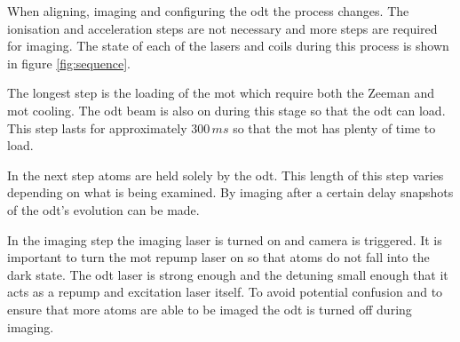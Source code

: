 When aligning, imaging and configuring the \gls{odt} the process changes. The ionisation and acceleration steps are not necessary and more steps are required for imaging. The state of each of the lasers and coils during this process is shown in figure \ref{fig:sequence}.

The longest step is the loading of the \gls{mot} which require both the Zeeman and \gls{mot} cooling. The \gls{odt} beam is also on during this stage so that the \gls{odt} can load. This step lasts for approximately $300\,\unit{ms}$ so that the \gls{mot} has plenty of time to load. 

In the next step atoms are held solely by the \gls{odt}. This length of this step varies depending on what is being examined. By imaging after a certain delay snapshots of the \gls{odt}'s evolution can be made.

In the imaging step the imaging laser is turned on and camera is triggered. It is important to turn the \gls{mot} repump laser on so that atoms do not fall into the dark state. The \gls{odt} laser is strong enough and the detuning small enough that it acts as a repump and excitation laser itself. To avoid potential confusion and to ensure that more atoms are able to be imaged the \gls{odt} is turned off during imaging.

